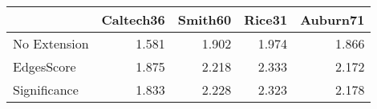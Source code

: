 \begin{tabular}{lrrrr}
\toprule
{} & Caltech36 & Smith60 & Rice31 & Auburn71 \\
\midrule
No Extension &     1.581 &   1.902 &  1.974 &    1.866 \\
EdgesScore   &     1.875 &   2.218 &  2.333 &    2.172 \\
Significance &     1.833 &   2.228 &  2.323 &    2.178 \\
\bottomrule
\end{tabular}

